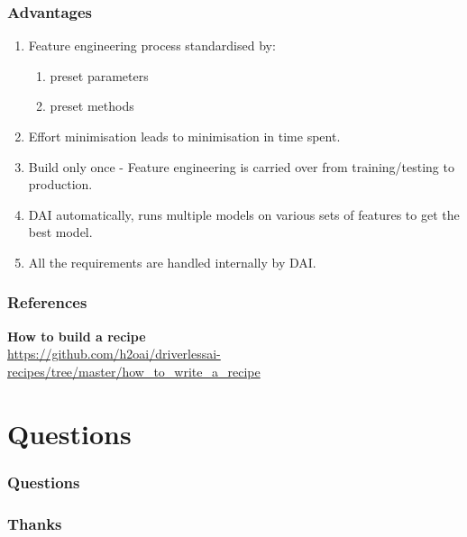 \documentclass[11pt,
               aspectratio=169,
               hyperref={colorlinks}
               ]{beamer}
\begin{document}
	\begin{frame}
		\frametitle{Advantages}
		\begin{enumerate}
			\item Feature engineering process standardised by:
				\begin{enumerate}
					\item preset parameters
					\item preset methods
				\end{enumerate}
			\item Effort minimisation leads to minimisation in time spent.
			\item Build only once - Feature engineering is carried over from training/testing to production.
			\item DAI automatically, runs multiple models on various sets of features to get the best model. 
			\item All the requirements are handled internally by DAI. 
		\end{enumerate}
\end{frame}

	\begin{frame}[t, allowframebreaks]
	
		\frametitle{References}	
		
			\textbf{How to build a recipe}\\
			\small{\url{https://github.com/h2oai/driverlessai-recipes/tree/master/how_to_write_a_recipe}}
			
		\framebreak		
		
		\printbibliography
		
	\end{frame}
	\section{Questions}

		\begin{frame}

			\frametitle{Questions}

		\end{frame}


		\begin{frame}

			\frametitle{Thanks}

		\end{frame}
\end{document}
